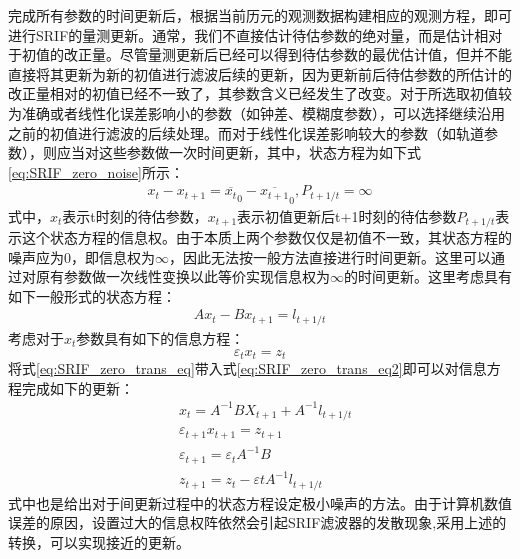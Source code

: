完成所有参数的时间更新后，根据当前历元的观测数据构建相应的观测方程，即可进行SRIF的量测更新。通常，我们不直接估计待估参数的绝对量，而是估计相对于初值的改正量。尽管量测更新后已经可以得到待估参数的最优估计值，但并不能直接将其更新为新的初值进行滤波后续的更新，因为更新前后待估参数的所估计的改正量相对的初值已经不一致了，其参数含义已经发生了改变。对于所选取初值较为准确或者线性化误差影响小的参数（如钟差、模糊度参数），可以选择继续沿用之前的初值进行滤波的后续处理。而对于线性化误差影响较大的参数（如轨道参数），则应当对这些参数做一次时间更新，其中，状态方程为如下式\eqref{eq:SRIF_zero_noise}所示：
\begin{equation}
	\begin{aligned}
		x_{t} - x_{t+1} = \overline{x_{t}}_{0} - \overline{x_{t+1}}_{0},P_{t+1/t}=\infty
	\end{aligned}
	\label{eq:SRIF_zero_noise}	
\end{equation}
式中，\(x_{t}\)表示t时刻的待估参数，\(x_{t+1}\)表示初值更新后t+1时刻的待估参数\(P_{t+1/t}\)表示这个状态方程的信息权。由于本质上两个参数仅仅是初值不一致，其状态方程的噪声应为0，即信息权为\(\infty\)，因此无法按一般方法直接进行时间更新。这里可以通过对原有参数做一次线性变换以此等价实现信息权为\(\infty\)的时间更新。这里考虑具有如下一般形式的状态方程：
\begin{equation}
	\begin{aligned}
		Ax_{t} - Bx_{t+1} = l_{t+1/t}
	\end{aligned}
	\label{eq:SRIF_zero_trans_eq}	
\end{equation}
考虑对于\(x_{t}\)参数具有如下的信息方程：
\begin{equation}
	\varepsilon_{t}x_{t}=z_{t}
	\label{eq:SRIF_zero_trans_eq2}
\end{equation}
将式\eqref{eq:SRIF_zero_trans_eq}带入式\eqref{eq:SRIF_zero_trans_eq2}即可以对信息方程完成如下的更新：
\begin{equation}
	\begin{aligned}
	& x_{t} = A^{-1}BX_{t+1}+A^{-1}l_{t+1/t}\\
	& \varepsilon_{t+1}x_{t+1}=z_{t+1}\\
	& \varepsilon_{t+1}=\varepsilon_{t}A^{-1}B\\
	& z_{t+1}=z_{t}-\varepsilon{t}A^{-1}l_{t+1/t}
	\end{aligned}
\end{equation}
式中也是给出对于间更新过程中的状态方程设定极小噪声的方法。由于计算机数值误差的原因，设置过大的信息权阵依然会引起SRIF滤波器的发散现象,采用上述的转换，可以实现接近的更新。

